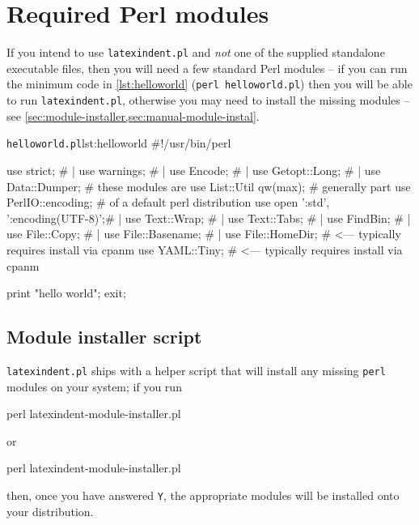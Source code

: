 \appendix
 \section{Required Perl modules}\label{sec:requiredmodules}
  If you intend to use \texttt{latexindent.pl} and \emph{not} one of the supplied
  standalone executable files, then you will need a few standard Perl modules -- if you can
  run the minimum code in \cref{lst:helloworld} (\texttt{perl helloworld.pl}) then you will
  be able to run \texttt{latexindent.pl}, otherwise you may need to install the missing
  modules -- see \cref{sec:module-installer,sec:manual-module-instal}.

  \begin{cmhlistings}[style=tcblatex,language=Perl]{\texttt{helloworld.pl}}{lst:helloworld}
#!/usr/bin/perl

use strict;                         #     |
use warnings;                       #     |
use Encode;                         #     |
use Getopt::Long;                   #     |
use Data::Dumper;                   #  these modules are      
use List::Util qw(max);             #  generally part         
use PerlIO::encoding;               #  of a default perl distribution 
use open ':std', ':encoding(UTF-8)';#     |
use Text::Wrap;                     #     |
use Text::Tabs;                     #     |
use FindBin;                        #     |
use File::Copy;                     #     |
use File::Basename;                 #     |
use File::HomeDir;                  # <--- typically requires install via cpanm
use YAML::Tiny;                     # <--- typically requires install via cpanm

print "hello world";
exit;
\end{cmhlistings}

 \subsection{Module installer script}\label{sec:module-installer}
   \texttt{latexindent.pl} ships with a
  helper script that will install any missing \texttt{perl} modules on your system; if you
  run
  \begin{commandshell}
perl latexindent-module-installer.pl
\end{commandshell}
  or
  \begin{dosprompt}
perl latexindent-module-installer.pl
 \end{dosprompt}
  then, once you have answered \texttt{Y}, the appropriate modules will be installed onto
  your distribution.


